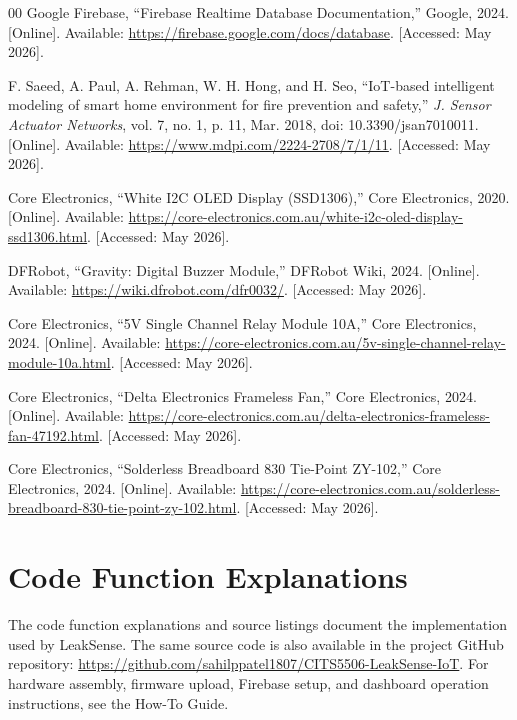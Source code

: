 \documentclass[a4paper,10pt,conference,onecolumn]{IEEEtran}
\begin{document}
\begin{thebibliography}{00}
Google Firebase, ``Firebase Realtime Database Documentation,'' Google, 2024.
[Online]. Available: \url{https://firebase.google.com/docs/database}.
[Accessed: May 2026].

F. Saeed, A. Paul, A. Rehman, W. H. Hong, and H. Seo, ``IoT-based intelligent 
modeling of smart home environment for fire prevention and safety,'' 
\emph{J. Sensor Actuator Networks}, vol. 7, no. 1, p. 11, Mar. 2018, 
doi: 10.3390/jsan7010011. [Online]. Available: \url{https://www.mdpi.com/2224-2708/7/1/11}. 
[Accessed: May 2026].

Core Electronics, ``White I2C OLED Display (SSD1306),'' Core Electronics, 
2020. [Online]. Available: 
\url{https://core-electronics.com.au/white-i2c-oled-display-ssd1306.html}. 
[Accessed: May 2026].

DFRobot, ``Gravity: Digital Buzzer Module,'' DFRobot Wiki, 2024. [Online]. 
Available: \url{https://wiki.dfrobot.com/dfr0032/}. [Accessed: May 2026].

Core Electronics, ``5V Single Channel Relay Module 10A,'' Core Electronics, 
2024. [Online]. Available: 
\url{https://core-electronics.com.au/5v-single-channel-relay-module-10a.html}. 
[Accessed: May 2026].

Core Electronics, ``Delta Electronics Frameless Fan,'' Core Electronics, 
2024. [Online]. Available: 
\url{https://core-electronics.com.au/delta-electronics-frameless-fan-47192.html}. 
[Accessed: May 2026].

Core Electronics, ``Solderless Breadboard 830 Tie-Point ZY-102,'' Core 
Electronics, 2024. [Online]. Available: 
\url{https://core-electronics.com.au/solderless-breadboard-830-tie-point-zy-102.html}. 
[Accessed: May 2026].

\end{thebibliography}
\endgroup

\appendices

\section{Code Function Explanations}
\label{sec:coding}

The code function explanations and source listings document the implementation
used by LeakSense. The same source code is also available in the
project GitHub repository:
\url{https://github.com/sahilppatel1807/CITS5506-LeakSense-IoT}. For hardware
assembly, firmware upload, Firebase setup, and dashboard operation instructions,
see the How-To Guide.
\end{document}
